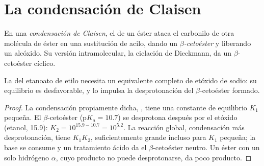 \section{La condensación de Claisen}

\begin{definition}\label{def:b2:enolates-aldol:claisen}
En una \emph{condensación de Claisen}, el  de un éster ataca el
carbonilo de otra molécula de éster en una sustitución de acilo, dando un \emph{$\beta$-cetoéster}
y liberando un alcóxido. Su versión intramolecular, la ciclación de
Dieckmann, da un $\beta$-cetoéster cíclico.
\end{definition}

\begin{proposition}\label{prop:b2:enolates-aldol:claisen-drive}
La  del etanoato de etilo necesita un equivalente completo de etóxido de sodio: su equilibrio
es desfavorable, y lo impulsa la desprotonación del $\beta$-cetoéster formado.
\end{proposition}

\begin{proof}
La condensación propiamente dicha, , tiene una constante de equilibrio
$K_1$ pequeña. El $\beta$-cetoéster ($\mathrm pK_a = 10.7$) se desprotona después por el etóxido (etanol, 15.9):
$K_2 = 10^{15.9 - 10.7} = 10^{5.2}$. La reacción global, condensación más desprotonación, tiene
$K_1K_2$, suficientemente grande incluso para $K_1$ pequeña; la base se consume y un tratamiento ácido da el
$\beta$-cetoéster neutro. Un éster con un solo hidrógeno $\alpha$, cuyo producto no puede desprotonarse, da
poco producto.
\end{proof}

